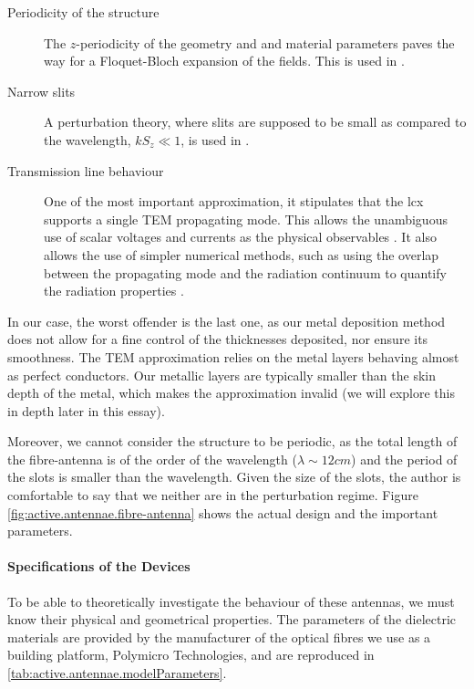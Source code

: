 \begin{description}
	\item [Periodicity of the structure] The $z$-periodicity of the geometry and 
		and material parameters paves the way for a Floquet-Bloch expansion of the 
		fields. This is used in \cite{WAN2001}.
	\item [Narrow slits] A perturbation theory, where slits are supposed to be 
			small as compared to the wavelength, $kS_z\ll1$, is used in \cite{KIM2007}.
	\item [Transmission line behaviour] One of the most important approximation, it stipulates
			that the \gls{lcx} supports a single TEM propagating mode. This allows the 
			unambiguous use of scalar voltages and currents as the physical observables
			\cite{PAU2007}. It also allows
			the use of simpler numerical methods, such as using the overlap between the 
			propagating mode and the radiation continuum to quantify the radiation 
			properties \cite{SHI1989,ADD2008}. 
\end{description}

In our case, the worst offender is the last one, as our metal deposition method
does not allow for a fine control of the thicknesses deposited, nor ensure its
smoothness. The TEM approximation relies on the metal layers behaving almost as 
perfect conductors. Our metallic layers are typically smaller than the skin
depth of the metal, which makes the approximation invalid (we will explore
this in depth later in this essay). 

Moreover, we cannot consider the structure to be periodic, as the total 
length of the fibre-antenna is of the order of the wavelength ($\lambda\sim12\unit{cm}$) and the period
of the slots is smaller than the wavelength. Given the size of the slots, 
the author is comfortable to say that we neither are in the perturbation regime. 
Figure \ref{fig:active.antennae.fibre-antenna} shows the actual design and the important parameters.

\paragraph{Specifications of the Devices}
To be able to theoretically investigate the behaviour of these antennas, we must
know their physical and geometrical properties. 
The parameters of the dielectric materials are provided by the manufacturer of the
optical fibres we use as a building platform,
Polymicro Technologies, and are reproduced in \ref{tab:active.antennae.modelParameters}.

